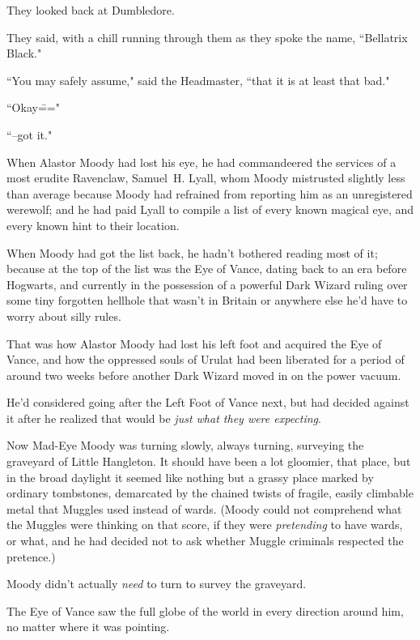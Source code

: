 They looked back at Dumbledore.

They said, with a chill running through them as they spoke the name, ``Bellatrix Black."

``You may safely assume," said the Headmaster, ``that it is at least that bad."

``Okay\==="

``\---got it."


When Alastor Moody had lost his eye, he had commandeered the services of a most erudite Ravenclaw, Samuel~H. Lyall, whom Moody mistrusted slightly less than average because Moody had refrained from reporting him as an unregistered werewolf; and he had paid Lyall to compile a list of every known magical eye, and every known hint to their location.

When Moody had got the list back, he hadn't bothered reading most of it; because at the top of the list was the Eye of Vance, dating back to an era before Hogwarts, and currently in the possession of a powerful Dark Wizard ruling over some tiny forgotten hellhole that wasn't in Britain or anywhere else he'd have to worry about silly rules.

That was how Alastor Moody had lost his left foot and acquired the Eye of Vance, and how the oppressed souls of Urulat had been liberated for a period of around two weeks before another Dark Wizard moved in on the power vacuum.

He'd considered going after the Left Foot of Vance next, but had decided against it after he realized that would be \emph{just what they were expecting}.

Now Mad-Eye Moody was turning slowly, always turning, surveying the graveyard of Little Hangleton. It should have been a lot gloomier, that place, but in the broad daylight it seemed like nothing but a grassy place marked by ordinary tombstones, demarcated by the chained twists of fragile, easily climbable metal that Muggles used instead of wards. (Moody could not comprehend what the Muggles were thinking on that score, if they were \emph{pretending} to have wards, or what, and he had decided not to ask whether Muggle criminals respected the pretence.)

Moody didn't actually \emph{need} to turn to survey the graveyard.

The Eye of Vance saw the full globe of the world in every direction around him, no matter where it was pointing.

